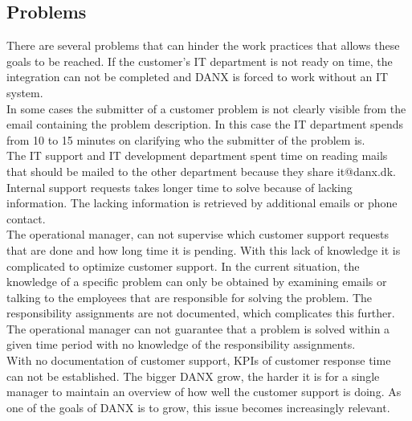 \subsection{Problems}
There are several problems that can hinder the work practices that allows these goals to be reached. If the customer’s IT department is not ready on time, the integration can not be completed and DANX is forced to work without an IT system.\cite{lasse008}\\
In some cases the submitter of a customer problem is not clearly visible from the email containing the problem description. In this case the IT department spends from 10 to 15 minutes\cite{lasse013} on clarifying who the submitter of the problem is.\\
The IT support and IT development department spent time on reading mails that should be mailed to the other department because they share it@danx.dk.\cite{lasse010}\\
Internal support requests takes longer time to solve because of lacking information. The lacking information is retrieved by additional emails or phone contact.\\
The operational manager, can not supervise which customer support requests that are done and how long time it is pending. With this lack of knowledge it is complicated to optimize customer support. In the current situation, the knowledge of a specific problem can only be obtained by examining emails or talking to the employees that are responsible for solving the problem. The responsibility assignments are not documented, which complicates this further.\cite{gert012} The operational manager can not guarantee that a problem is solved within a given time period with no knowledge of the responsibility assignments.\\
With no documentation of customer support, KPIs of customer response time can not be established.\cite{gert011} The bigger DANX grow, the harder it is for a single manager to maintain an overview of how well the customer support is doing. As one of the goals of DANX is to grow, this issue becomes increasingly relevant.

